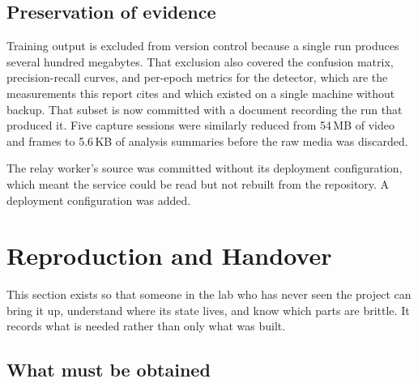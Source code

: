 \documentclass[11pt,a4paper]{article}
\begin{document}
\subsection{Preservation of evidence}

Training output is excluded from version control because a single run produces
several hundred megabytes. That exclusion also covered the confusion matrix,
precision-recall curves, and per-epoch metrics for the detector, which are the
measurements this report cites and which existed on a single machine without
backup. That subset is now committed with a document recording the run that
produced it. Five capture sessions were similarly reduced from 54\,MB of video and
frames to 5.6\,KB of analysis summaries before the raw media was discarded.

The relay worker's source was committed without its deployment configuration,
which meant the service could be read but not rebuilt from the repository. A
deployment configuration was added.

\section{Reproduction and Handover}
\label{sec:handover}

This section exists so that someone in the lab who has never seen the project
can bring it up, understand where its state lives, and know which parts are
brittle. It records what is needed rather than only what was built.

\subsection{What must be obtained}
\end{document}
